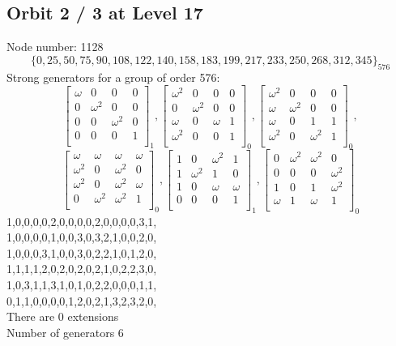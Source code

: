 \subsection*{Orbit 2 / 3 at Level 17}
Node number: 1128\\
$$
\{ 0, 25, 50, 75, 90, 108, 122, 140, 158, 183, 199, 217, 233, 250, 268, 312, 345 \}_{576}$$
{\small\arraycolsep=2pt
Strong generators for a group of order 576:
$$
\left[
\begin{array}{*{4}{r}}
\omega  & 0 & 0 & 0\\
0 & \omega^{2} & 0 & 0\\
0 & 0 & \omega^{2} & 0\\
0 & 0 & 0 & 1\\
\end{array}
\right]
_{1}
, 
\left[
\begin{array}{*{4}{r}}
\omega^{2} & 0 & 0 & 0\\
0 & \omega^{2} & 0 & 0\\
\omega  & 0 & \omega  & 1\\
\omega^{2} & 0 & 0 & 1\\
\end{array}
\right]
_{0}
, 
\left[
\begin{array}{*{4}{r}}
\omega^{2} & 0 & 0 & 0\\
\omega  & \omega^{2} & 0 & 0\\
\omega  & 0 & 1 & 1\\
\omega^{2} & 0 & \omega^{2} & 1\\
\end{array}
\right]
_{0}
, 
$$
$$
\left[
\begin{array}{*{4}{r}}
\omega  & \omega  & \omega  & \omega \\
\omega^{2} & 0 & \omega^{2} & 0\\
\omega^{2} & 0 & \omega^{2} & \omega \\
0 & \omega^{2} & \omega^{2} & 1\\
\end{array}
\right]
_{0}
, 
\left[
\begin{array}{*{4}{r}}
1 & 0 & \omega^{2} & 1\\
1 & \omega^{2} & 1 & 0\\
1 & 0 & \omega  & \omega \\
0 & 0 & 0 & 1\\
\end{array}
\right]
_{1}
, 
\left[
\begin{array}{*{4}{r}}
0 & \omega^{2} & \omega^{2} & 0\\
0 & 0 & 0 & \omega^{2}\\
1 & 0 & 1 & \omega^{2}\\
\omega  & 1 & \omega  & 1\\
\end{array}
\right]
_{0}
$$
1,0,0,0,0,2,0,0,0,0,2,0,0,0,0,3,1,\\
1,0,0,0,0,1,0,0,3,0,3,2,1,0,0,2,0,\\
1,0,0,0,3,1,0,0,3,0,2,2,1,0,1,2,0,\\
1,1,1,1,2,0,2,0,2,0,2,1,0,2,2,3,0,\\
1,0,3,1,1,3,1,0,1,0,2,2,0,0,0,1,1,\\
0,1,1,0,0,0,0,1,2,0,2,1,3,2,3,2,0,\\
}
There are 0 extensions\\
Number of generators 6\\
